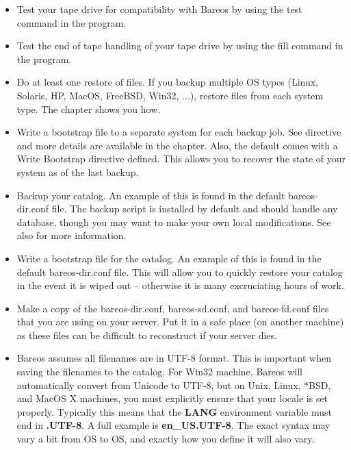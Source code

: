 \begin{itemize}
\item Test your tape drive for compatibility with Bareos by using the  test
   command in the  program.
\item Test the end of tape handling of your tape drive by using the
   fill command in the  program.
\item Do at least one restore of files. If you backup multiple OS types
   (Linux, Solaris, HP, MacOS, FreeBSD, Win32, ...),
   restore files from each system type. The
    chapter shows you how.
\item Write a bootstrap file to a separate system for each backup job.
   See  directive and more details are available in the
    chapter. Also, the default
    comes with a Write Bootstrap directive defined. This  allows
   you to recover the state of your system as of the last backup.
\item Backup your catalog. An example of this is found in the default
   bareos-dir.conf file. The backup script is installed by default and
   should handle any database, though you may want to make your own local
   modifications.  See also  for more
   information.
\item Write a bootstrap file for the catalog. An example of this is found in
   the default bareos-dir.conf file. This will allow you to quickly restore your
   catalog in the event it is wiped out -- otherwise it  is many excruciating
   hours of work.
\item Make a copy of the bareos-dir.conf, bareos-sd.conf, and
   bareos-fd.conf files that you are using on your server. Put it in a safe
   place (on another machine) as these files can be difficult to
   reconstruct if your server dies.
\item Bareos assumes all filenames are in UTF-8 format. This is important
   when saving the filenames to the catalog. For Win32 machine, Bareos will
   automatically convert from Unicode to UTF-8, but on Unix, Linux, *BSD,
   and MacOS X machines, you must explicitly ensure that your locale is set
   properly. Typically this means that the {\bf LANG} environment variable
   must end in {\bf .UTF-8}. A full example is {\bf en\_US.UTF-8}. The
   exact syntax may vary a bit from OS to OS, and exactly how you define it
   will also vary.


\end{itemize}
